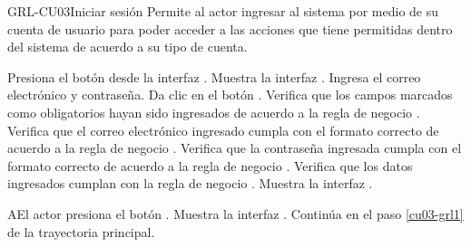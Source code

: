 \begin{UseCase}[]{GRL-CU03}{Iniciar sesión}{
	Permite al actor ingresar al sistema por medio de su cuenta de usuario para poder acceder a las
acciones que tiene permitidas dentro del sistema de acuerdo a su tipo de cuenta.
}
\end{UseCase}

\begin{UCtrayectoria}
	\UCpaso [\UCactor] Presiona el botón  desde la interfaz .
    \UCpaso [\UCsist] Muestra la interfaz .
	\UCpaso [\UCactor] Ingresa el correo electrónico y contraseña.\label{cu03-grl1}
	\UCpaso [\UCactor] Da clic en el botón .   
	\UCpaso [\UCsist] Verifica que los campos marcados como obligatorios hayan sido ingresados de acuerdo a la
	regla de negocio .
	\UCpaso [\UCsist] Verifica que el correo electrónico ingresado cumpla con el formato correcto de acuerdo a la regla de negocio  .  
	\UCpaso [\UCsist] Verifica que la contraseña ingresada cumpla con el formato correcto de acuerdo a la regla de negocio  .
	\UCpaso [\UCsist] Verifica que los datos ingresados cumplan con la regla de negocio . 
    \UCpaso [\UCsist] Muestra la interfaz . %
\end{UCtrayectoria}

\begin{UCtrayectoriaA}{A}{El actor presiona el botón .}
	\UCpaso [\UCsist] Muestra la interfaz .
	\UCpaso [\UCsist] Continúa en el paso \ref{cu03-grl1} de la trayectoria principal.
\end{UCtrayectoriaA}


